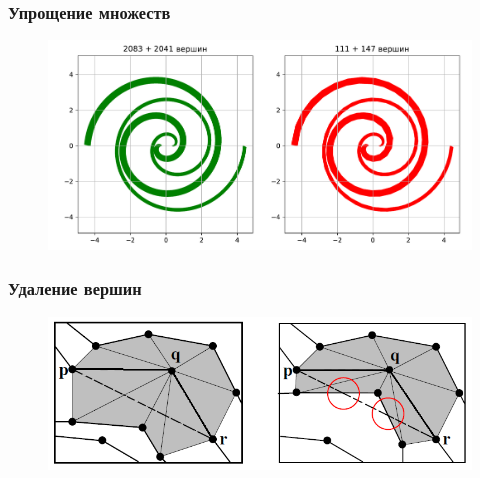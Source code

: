 \documentclass{beamer}
\begin{document}
  
  \begin{frame}
    \frametitle{Упрощение множеств}

    \begin{figure}
        \includegraphics[width=1.0\textwidth]{spiral_simple}
    \end{figure}

  \end{frame}



  \begin{frame}
    \frametitle{Удаление вершин}

    \begin{figure}
        \includegraphics[width=1.0\textwidth]{platelet}
    \end{figure}

  \end{frame}

\end{document}
